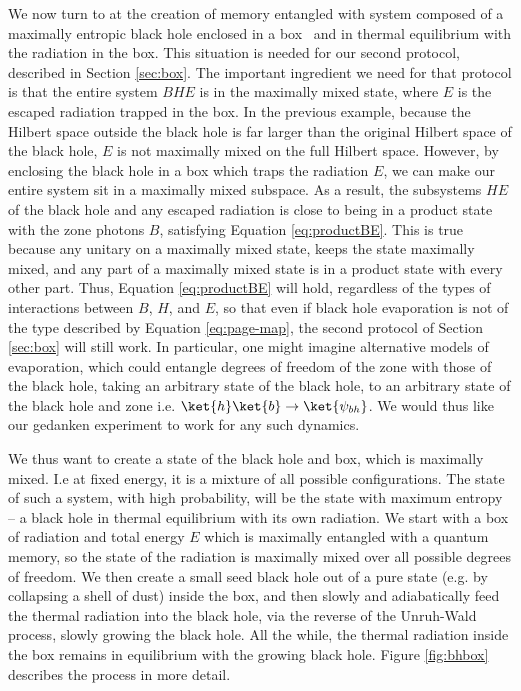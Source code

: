 \documentclass[12pt,a4paper]{article}
\begin{document}
We now turn to at the creation of memory entangled with system composed of a maximally entropic black hole enclosed in a box~\cite{hawking1976black,hawking1983thermodynamics} and in thermal equilibrium with the radiation in the box. This situation is needed for our second protocol, described in Section \ref{sec:box}. 
The important ingredient we need for that protocol is that the entire system $BHE$ is in the maximally mixed state, where $E$ is the escaped radiation trapped in the box. In the previous example, because the Hilbert space outside the black hole is far larger than the original Hilbert space of the black hole, $E$ is not maximally mixed on the full Hilbert space. However, by enclosing the black hole in a box which traps the radiation $E$, we can make our entire system sit in a maximally mixed subspace. As a result,
the subsystems $HE$ of the black hole and any escaped radiation is close to being in a product state with the zone photons $B$, satisfying Equation \eqref{eq:productBE}. This is true because any unitary on a maximally mixed state, keeps the state maximally mixed, and any part of a maximally mixed state is in a product state with every other part. Thus, Equation \eqref{eq:productBE} will hold, regardless of the types of interactions between $B$, $H$, and $E$, so that even if black hole evaporation is not of the type described by Equation \eqref{eq:page-map}, the second protocol of Section \ref{sec:box} will still work. In particular, one might imagine alternative models of evaporation, which could entangle degrees of freedom of the zone with those of the black hole, taking an arbitrary state of the black hole, to an arbitrary state of the black hole and zone i.e. $\ket{h}\ket{b}\rightarrow\ket{\psi_{bh}}$. We would thus like our gedanken experiment to work for any such dynamics.

 
We thus want to create a state of the black hole and box, which is maximally mixed. I.e at fixed energy, it is a mixture of all possible configurations. The state of such a system, with high probability, will be the state with maximum entropy -- a black hole in thermal equilibrium with its own radiation. We start with a box of radiation and total energy $E$ which is maximally entangled with a quantum memory, so the state of the radiation is maximally mixed over all possible degrees of freedom. We then create a small seed black hole out of a pure state (e.g. by collapsing a shell of dust) inside the box, and then slowly and adiabatically feed the thermal radiation into the black hole, via the reverse of the Unruh-Wald process, slowly growing the black hole. All the while, the thermal radiation inside the box remains in equilibrium with the growing black hole.  Figure \ref{fig:bhbox} describes the process in more detail.
\end{document}
